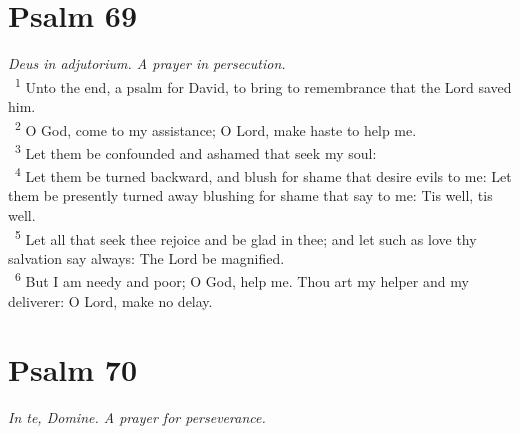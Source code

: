 \documentclass[a5paper,12pt]{article}
\begin{document}
\begin{multicols*}{2}
\section{Psalm 69}
\label{sec:orgf50b6b3}
\emph{Deus in adjutorium. A prayer in persecution.}\\

~\textsuperscript{1} Unto the end, a psalm for David, to bring to remembrance that the Lord saved him.\\
~\textsuperscript{2} O God, come to my assistance; O Lord, make haste to help me.\\
~\textsuperscript{3} Let them be confounded and ashamed that seek my soul:\\
~\textsuperscript{4} Let them be turned backward, and blush for shame that desire evils to me: Let them be presently turned away blushing for shame that say to me: Tis well, tis well.\\
~\textsuperscript{5} Let all that seek thee rejoice and be glad in thee; and let such as love thy salvation say always: The Lord be magnified.\\
~\textsuperscript{6} But I am needy and poor; O God, help me. Thou art my helper and my deliverer: O Lord, make no delay.\\

\section{Psalm 70}
\label{sec:orged85db5}
\emph{In te, Domine. A prayer for perseverance.}\\


\end{multicols*}
\end{document}
